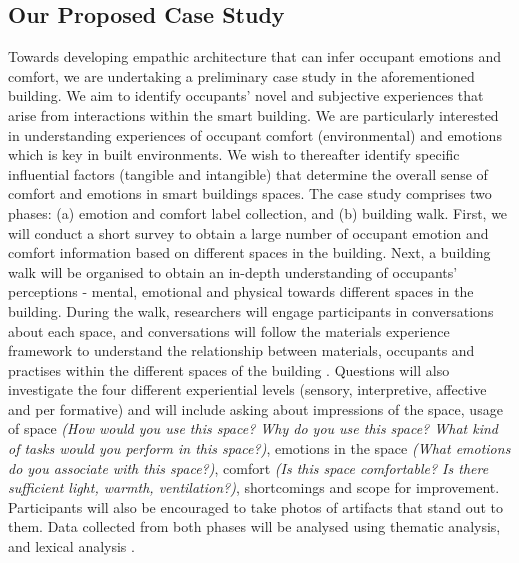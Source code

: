 \documentclass[manuscript, anonymous, review]{acmart}
\begin{document}
\subsection{Our Proposed Case Study} 
Towards developing empathic architecture that can infer occupant emotions and comfort, we are undertaking a preliminary case study in the aforementioned building. We aim to identify occupants' novel and subjective experiences that arise from interactions within the smart building. We are particularly interested in understanding experiences of occupant comfort (environmental) and emotions \cite{alavi2017comfort} which is key in built environments.  We wish to thereafter identify specific influential factors (tangible and intangible) that determine the overall sense of comfort and emotions in smart buildings spaces. The case study comprises two phases: (a) emotion and comfort label collection, and (b) building walk. First, we will conduct a short survey to obtain a large number of occupant emotion and comfort information based on different spaces in the building. Next, a building walk will be organised to obtain an in-depth understanding of occupants' perceptions - mental, emotional and physical towards different spaces in the building. During the walk, researchers will engage participants in conversations about each space, and conversations will follow the materials experience framework to understand the relationship between materials, occupants and practises within the different spaces of the building \cite{giaccardi2015foundations}. Questions will also investigate the four different experiential levels (sensory, interpretive, affective and per formative) and will include asking about impressions of the space, usage of space \textit{(How would you use this space? Why do you use this space? What kind of tasks would you perform in this space?)}, emotions in the space \textit{(What emotions do you associate with this space?)}, comfort \textit{(Is this space comfortable? Is there sufficient light, warmth, ventilation?)}, shortcomings and scope for improvement. Participants will also be encouraged to take photos of artifacts that stand out to them. Data collected from both phases will be analysed using thematic analysis, and lexical analysis \cite{braun2006using, xue2020mood}. 
\end{document}
